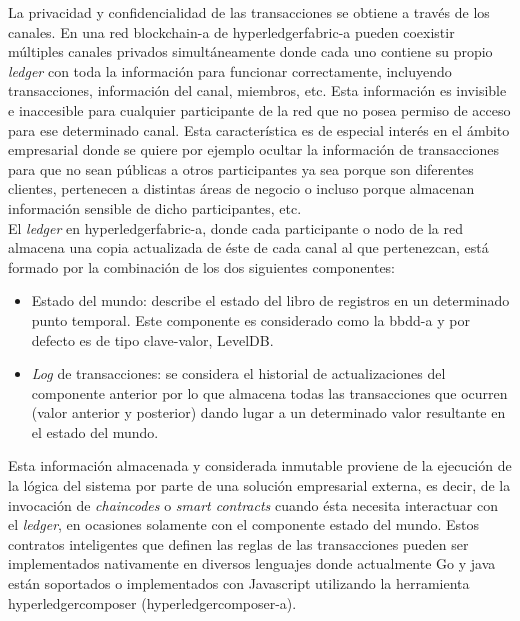 \documentclass[12pt,a4paper, twoside]{report}
\begin{document}
	La privacidad y confidencialidad de las transacciones se obtiene a través de los canales. En una red \gls{blockchain-a} de \gls{hyperledgerfabric-a} pueden coexistir múltiples canales privados simultáneamente donde cada uno contiene su propio \textit{ledger} con toda la información para funcionar correctamente, incluyendo transacciones, información del canal, miembros, etc. Esta información es invisible e inaccesible para cualquier participante de la red que no posea permiso de acceso para ese determinado canal. Esta característica es de especial interés en el ámbito empresarial donde se quiere por ejemplo ocultar la información de transacciones para que no sean públicas a otros participantes ya sea porque son diferentes clientes, pertenecen a distintas áreas de negocio o incluso porque almacenan información sensible de dicho participantes, etc. \\

	El \textit{ledger} en \gls{hyperledgerfabric-a}, donde cada participante o nodo de la red almacena una copia actualizada de éste de cada canal al que pertenezcan, está formado por la combinación de los dos siguientes componentes:

	\begin{itemize}
		\item Estado del mundo: describe el estado del libro de registros en un determinado punto temporal. Este componente es considerado como la \gls{bbdd-a} y por defecto es de tipo clave-valor, LevelDB.
		\item \textit{Log} de transacciones: se considera el historial de actualizaciones del componente anterior por lo que almacena todas las transacciones que ocurren (valor anterior y posterior) dando lugar a un determinado valor resultante en el estado del mundo. 
	\end{itemize}

	Esta información almacenada y considerada inmutable proviene de la ejecución de la lógica del sistema por parte de una solución empresarial externa, es decir, de la invocación de \textit{\glspl{chaincode}} o \textit{smart contracts} cuando ésta necesita interactuar con el \textit{ledger}, en ocasiones solamente con el componente estado del mundo. Estos contratos inteligentes que definen las reglas de las transacciones pueden ser implementados nativamente en diversos lenguajes donde actualmente Go y \gls{java} están soportados o implementados con Javascript utilizando la herramienta \Gls{hyperledgercomposer} (\gls{hyperledgercomposer-a}). \\
	
\end{document}
